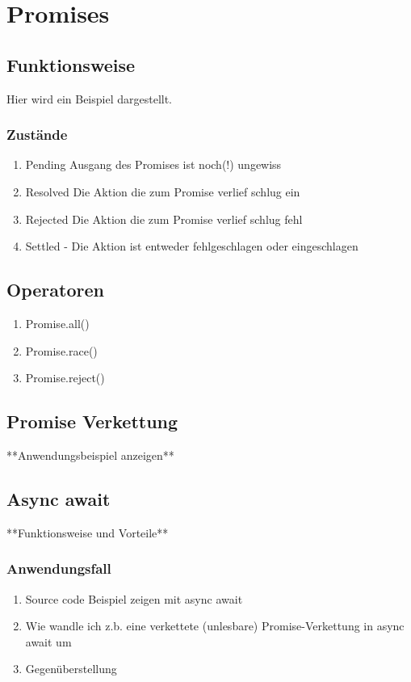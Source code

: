 \section{Promises}

\subsection{Funktionsweise}
Hier wird ein Beispiel dargestellt.

\subsubsection{Zustände}

\begin{enumerate} 
\item Pending Ausgang des Promises ist noch(!) ungewiss
\item Resolved Die Aktion die zum Promise verlief schlug ein
\item Rejected Die Aktion die zum Promise verlief schlug fehl
\item Settled - Die Aktion ist entweder fehlgeschlagen oder eingeschlagen
\end{enumerate}

\subsection{Operatoren}

\begin{enumerate} 
\item Promise.all()
\item Promise.race() 
\item Promise.reject()
\end{enumerate}

\subsection{Promise Verkettung}
**Anwendungsbeispiel anzeigen**

\subsection{Async await}
**Funktionsweise und Vorteile**

\subsubsection{Anwendungsfall}

\begin{enumerate} 
\item Source code Beispiel zeigen mit async await
\item Wie wandle ich z.b. eine verkettete (unlesbare) Promise-Verkettung in async await um 
\item Gegenüberstellung
\end{enumerate}



